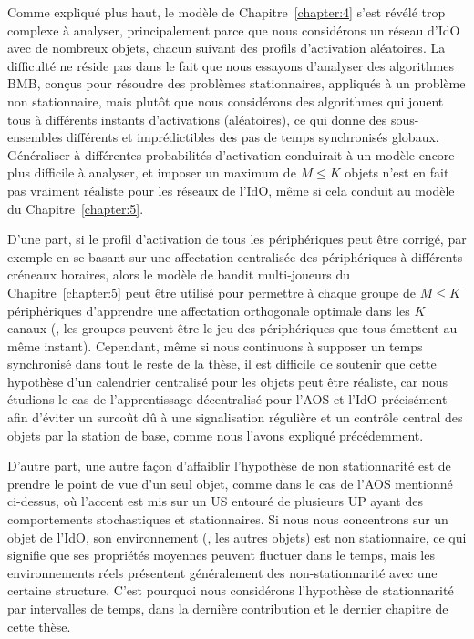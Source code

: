 \begin{resume_fr}
Comme expliqué plus haut, le modèle de Chapitre~\ref{chapter:4} s'est révélé trop complexe à analyser, principalement parce que nous considérons un réseau d'IdO avec de nombreux objets, chacun suivant des profils d'activation aléatoires.
La difficulté ne réside pas dans le fait que nous essayons d'analyser des algorithmes BMB, conçus pour résoudre des problèmes stationnaires, appliqués à un problème non stationnaire,
mais plutôt que nous considérons des algorithmes qui jouent tous à différents instants d'activations (aléatoires), ce qui donne des sous-ensembles différents et imprédictibles des pas de temps synchronisés globaux.
Généraliser à différentes probabilités d'activation conduirait à un modèle encore plus difficile à analyser, et imposer un maximum de $M \leq K$ objets n'est en fait pas vraiment réaliste pour les réseaux de l'IdO, même si cela conduit au modèle du Chapitre~\ref{chapter:5}.

D'une part, si le profil d'activation de tous les périphériques peut être corrigé, par exemple en se basant sur une affectation centralisée des périphériques à différents créneaux horaires, alors le modèle de bandit multi-joueurs du Chapitre~\ref{chapter:5} peut être utilisé pour permettre à chaque groupe de $M \leq K$ périphériques d'apprendre une affectation orthogonale optimale dans les $K$ canaux (\eg, les groupes peuvent être le jeu des périphériques que tous émettent au même instant).
%
Cependant, même si nous continuons à supposer un temps synchronisé dans tout le reste de la thèse,
il est difficile de soutenir que cette hypothèse d'un calendrier centralisé pour les objets peut être réaliste, car nous étudions le cas de l'apprentissage décentralisé pour l'AOS et l'IdO précisément afin d'éviter un surcoût dû à une signalisation régulière et un contrôle central des objets par la station de base, comme nous l'avons expliqué précédemment.

D'autre part, une autre façon d'affaiblir l'hypothèse de non stationnarité est de prendre le point de vue d'un seul objet, comme dans le cas de l'AOS mentionné ci-dessus, où l'accent est mis sur un US entouré de plusieurs UP ayant des comportements stochastiques et stationnaires.
Si nous nous concentrons sur un objet de l'IdO, son environnement (\ie, les autres objets) est non stationnaire, ce qui signifie que ses propriétés moyennes peuvent fluctuer dans le temps, mais les environnements réels présentent généralement des non-stationnarité avec une certaine structure.
C'est pourquoi nous considérons l'hypothèse de stationnarité par intervalles de temps, dans la dernière contribution et le dernier chapitre de cette thèse.



\end{resume_fr}
